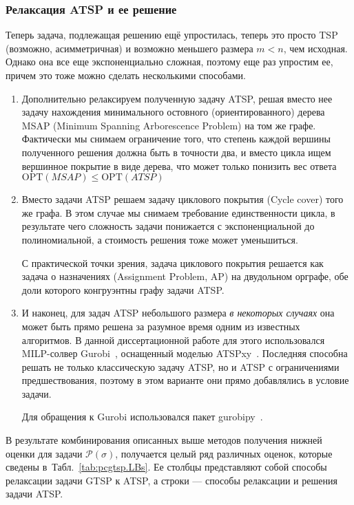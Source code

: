 \subsubsection{Релаксация ATSP и ее решение}
Теперь задача,
подлежащая решению ещё упростилась,
теперь это просто TSP
(возможно, асимметричная)
и возможно меньшего размера $m<n$,
чем исходная.
Однако она все еще экспоненциально сложная,
поэтому еще раз упростим ее,
причем это тоже можно сделать несколькими способами.

\begin{enumerate}
  \item
  Дополнительно релаксируем полученную задачу ATSP,
  решая вместо нее задачу нахождения
  минимального остовного (ориентированного) дерева
  MSAP
  (Minimum Spanning Arborescence Problem)
  на том же графе.
  Фактически мы снимаем ограничение того,
  что степень каждой вершины полученного решения должна
  быть в точности два,
  и вместо цикла ищем вершинное покрытие
  в виде дерева,
  что может только понизить вес ответа
  $\mathrm{OPT}(MSAP) \leqslant \mathrm{OPT}(ATSP)$
  \item
  Вместо задачи ATSP решаем задачу циклового покрытия
  (Cycle cover) того же графа.
  В этом случае мы снимаем требование единственности цикла,
  в результате чего сложность задачи понижается с экспоненциальной
  до полиномиальной,
  а стоимость решения тоже может уменьшиться.

  С практической точки зрения,
  задача циклового покрытия решается как
  задача о назначениях
  (Assignment Problem, AP)
  на двудольном орграфе,
  обе доли которого конгруэнтны
  графу задачи ATSP.
  \item
  И наконец,
  для задач ATSP
  небольшого размера
  \textit{в некоторых случаях}
  она может быть прямо решена
  за разумное время одним
  из известных алгоритмов.
  В данной диссертационной работе
  для этого использовался MILP-солвер
  Gurobi~\cite{bi:Gurobi},
  оснащенный моделью
  ATSPxy~\autocite{SARIN2005}.
  Последняя способна решать не только
  классическую задачу ATSP,
  но и ATSP с ограничениями предшествования,
  поэтому в этом варианте они прямо
  добавлялись в условие задачи.

  Для обращения к Gurobi
  использовался пакет gurobipy~\cite{bi:GurobiPy}.
\end{enumerate}

В результате комбинирования описанных выше методов
получения нижней оценки для задачи
$\mathcal P(\sigma)$,
получается целый ряд различных оценок,
которые сведены в~Табл.~\ref{tab:pcgtsp.LBs}.
Ее столбцы представляют собой способы релаксации
задачи GTSP к ATSP,
а строки --- способы релаксации и решения
задачи ATSP.

